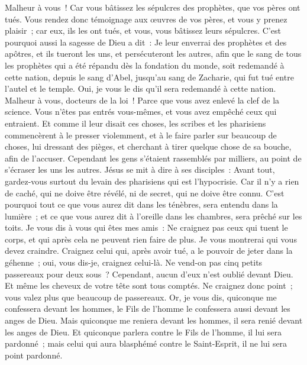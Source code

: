 \begin{multicols}{2}
Malheur à vous~! Car vous bâtissez les sépulcres des prophètes, que vos pères ont tués.
Vous rendez donc témoignage aux œuvres de vos pères, et vous y prenez plaisir~; car eux, ils les ont tués, et vous, vous bâtissez leurs sépulcres.
C'est pourquoi aussi la sagesse de Dieu a dit~: Je leur enverrai des prophètes et des apôtres, et ils tueront les uns, et persécuteront les autres,
afin que le sang de tous les prophètes qui a été répandu dès la fondation du monde, soit redemandé à cette nation,
depuis le sang d'Abel, jusqu'au sang de Zacharie, qui fut tué entre l'autel et le temple. Oui, je vous le dis qu'il sera redemandé à cette nation.
Malheur à vous, docteurs de la loi~! Parce que vous avez enlevé la clef de la science. Vous n'êtes pas entrés vous-mêmes, et vous avez empêché ceux qui entraient.
Et comme il leur disait ces choses, les scribes et les pharisiens commencèrent à le presser violemment, et à le faire parler sur beaucoup de choses,
lui dressant des pièges, et cherchant à tirer quelque chose de sa bouche, afin de l'accuser.
\VerseOne{}Cependant les gens s'étaient rassemblés par milliers, au point de s'écraser les uns les autres. Jésus se mit à dire à ses disciples~: Avant tout, gardez-vous surtout du levain des pharisiens qui est l'hypocrisie.
Car il n'y a rien de caché, qui ne doive être révélé, ni de secret, qui ne doive être connu.
C'est pourquoi tout ce que vous aurez dit dans les ténèbres, sera entendu dans la lumière~; et ce que vous aurez dit à l'oreille dans les chambres, sera prêché sur les toits.
Je vous dis à vous qui êtes mes amis~: Ne craignez pas ceux qui tuent le corps, et qui après cela ne peuvent rien faire de plus.
Je vous montrerai qui vous devez craindre. Craignez celui qui, après avoir tué, a le pouvoir de jeter dans la géhenne~; oui, vous dis-je, craignez celui-là.
Ne vend-on pas cinq petits passereaux pour deux sous~? Cependant, aucun d'eux n'est oublié devant Dieu.
Et même les cheveux de votre tête sont tous comptés. Ne craignez donc point~; vous valez plus que beaucoup de passereaux.
Or, je vous dis, quiconque me confessera devant les hommes, le Fils de l'homme le confessera aussi devant les anges de Dieu.
Mais quiconque me reniera devant les hommes, il sera renié devant les anges de Dieu.
Et quiconque parlera contre le Fils de l'homme, il lui sera pardonné~; mais celui qui aura blasphémé contre le Saint-Esprit, il ne lui sera point pardonné.

\end{multicols}
